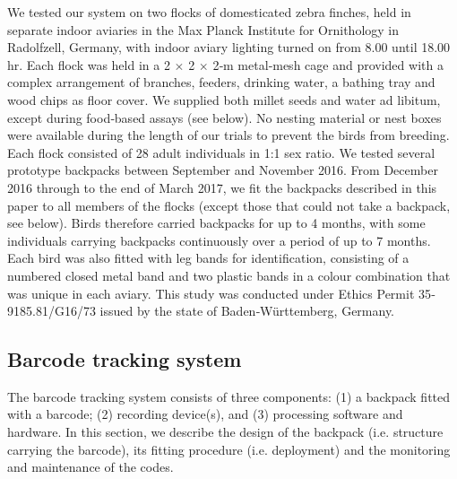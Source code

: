 \documentclass[11pt,a4paper,twoside]{book}
\begin{document}
\begin{doublespace}
We tested our system on two flocks of domesticated zebra finches, held in separate indoor aviaries in the Max Planck Institute for Ornithology in Radolfzell, Germany, with indoor aviary lighting turned on from 8.00 until 18.00 hr. Each flock was held in a 2 $\times$ 2 $\times$ 2‐m metal‐mesh cage and provided with a complex arrangement of branches, feeders, drinking water, a bathing tray and wood chips as floor cover. We supplied both millet seeds and water ad libitum, except during food‐based assays (see below). No nesting material or nest boxes were available during the length of our trials to prevent the birds from breeding. Each flock consisted of 28 adult individuals in 1:1 sex ratio. We tested several prototype backpacks between September and November 2016. From December 2016 through to the end of March 2017, we fit the backpacks described in this paper to all members of the flocks (except those that could not take a backpack, see below). Birds therefore carried backpacks for up to 4 months, with some individuals carrying backpacks continuously over a period of up to 7 months. Each bird was also fitted with leg bands for identification, consisting of a numbered closed metal band and two plastic bands in a colour combination that was unique in each aviary. This study was conducted under Ethics Permit 35‐9185.81/G16/73 issued by the state of Baden‐Württemberg, Germany.

\subsection{Barcode tracking system}
The barcode tracking system consists of three components: (1) a backpack fitted with a barcode; (2) recording device(s), and (3) processing software and hardware. In this section, we describe the design of the backpack (i.e. structure carrying the barcode), its fitting procedure (i.e. deployment) and the monitoring and maintenance of the codes.


\end{doublespace}
\end{document}
